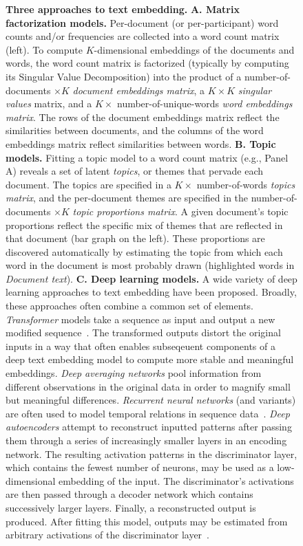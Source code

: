 \documentclass{article}
\begin{document}
\begin{figure}[tp]
\caption{\textbf{Three approaches to text embedding.}  \textbf{A. Matrix factorization models.} Per-document (or per-participant) word counts and/or frequencies are collected into a word count matrix (left).  To compute $K$-dimensional embeddings of the documents and words, the word count matrix is factorized (typically by computing its Singular Value Decomposition) into the product of a number-of-documents $\times K$ \textit{document embeddings matrix}, a $K \times K$ \textit{singular values} matrix, and a $K \times $ number-of-unique-words \textit{word embeddings matrix}.  The rows of the document embeddings matrix reflect the similarities between documents, and the columns of the word embeddings matrix reflect similarities between words.  \textbf{B. Topic models.}  Fitting a topic model to a word count matrix (e.g., Panel A) reveals a set of latent \textit{topics}, or themes that pervade each document.  The topics are specified in a $K \times$ number-of-words \textit{topics matrix}, and the per-document themes are specified in the number-of-documents $\times K$ \textit{topic proportions matrix}. A given document's topic proportions reflect the specific mix of themes that are reflected in that document (bar graph on the left).  These proportions are discovered automatically by estimating the topic from which each word in the document is most probably drawn (highlighted words in \textit{Document text}).  \textbf{C. Deep learning models.}  A wide variety of deep learning approaches to text embedding have been proposed.  Broadly, these approaches often combine a common set of elements.  \textit{Transformer} models take a sequence as input and output a new modified sequence~\citep[diagram adapted from][]{ViswEtal17}.  The transformed outputs distort the original inputs in a way that often enables subseqeuent components of a deep text embedding model to compute more stable and meaningful embeddings.  \textit{Deep averaging networks} pool information from different observations in the original data in order to magnify small but meaningful differences.  \textit{Recurrent neural networks} (and variants) are often used to model temporal relations in sequence data~\citep[the deep averaging network and recurrent neural network diagrams are loosely inspired by figures from][]{IyyeEtal15}.  \textit{Deep autoencoders} attempt to reconstruct inputted patterns after passing them through a series of increasingly smaller layers in an encoding network.  The resulting activation patterns in the discriminator layer, which contains the fewest number of neurons, may be used as a low-dimensional embedding of the input.  The discriminator's activations are then passed through a decoder network which contains successively larger layers.  Finally, a reconstructed output is produced.  After fitting this model, outputs may be estimated from arbitrary activations of the discriminator layer~\citep[diagram loosly inspired by][]{YousHame17}.}
\label{fig:embedding-models}
\end{figure}
\end{document}
